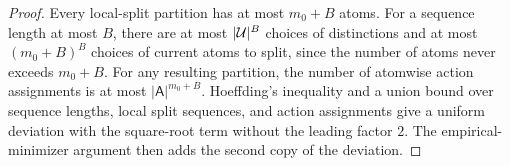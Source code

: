 \begin{proof}
Every local-split partition has at most $m_0+B$ atoms. For a sequence length at most $B$, there are at most $|\mathcal{U}|^B$ choices of distinctions and at most $(m_0+B)^B$ choices of current atoms to split, since the number of atoms never exceeds $m_0+B$. For any resulting partition, the number of atomwise action assignments is at most $|\mathsf A|^{m_0+B}$. Hoeffding's inequality and a union bound over sequence lengths, local split sequences, and action assignments give a uniform deviation with the square-root term without the leading factor $2$. The empirical-minimizer argument then adds the second copy of the deviation.
\end{proof}
